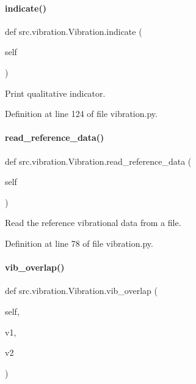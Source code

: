 \paragraph{\texorpdfstring{indicate()}{indicate()}}
{\footnotesize\ttfamily def src.\+vibration.\+Vibration.\+indicate (\begin{DoxyParamCaption}\item[{}]{self }\end{DoxyParamCaption})}



Print qualitative indicator. 



Definition at line 124 of file vibration.\+py.

\mbox{\label{classsrc_1_1vibration_1_1Vibration_a3e59c6a1f71154e1beb9c492f9eb753d}} 
\paragraph{\texorpdfstring{read\+\_\+reference\+\_\+data()}{read\_reference\_data()}}
{\footnotesize\ttfamily def src.\+vibration.\+Vibration.\+read\+\_\+reference\+\_\+data (\begin{DoxyParamCaption}\item[{}]{self }\end{DoxyParamCaption})}



Read the reference vibrational data from a file. 



Definition at line 78 of file vibration.\+py.

\mbox{\label{classsrc_1_1vibration_1_1Vibration_a313f115cc437be87ece62c496ff8b7a5}} 
\paragraph{\texorpdfstring{vib\+\_\+overlap()}{vib\_overlap()}}
{\footnotesize\ttfamily def src.\+vibration.\+Vibration.\+vib\+\_\+overlap (\begin{DoxyParamCaption}\item[{}]{self,  }\item[{}]{v1,  }\item[{}]{v2 }\end{DoxyParamCaption})}



